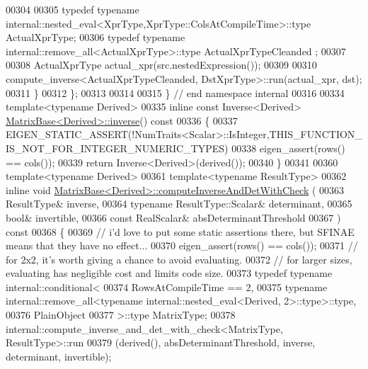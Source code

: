 \begin{DoxyCode}
00304 
00305     \textcolor{keyword}{typedef} \textcolor{keyword}{typename} internal::nested\_eval<XprType,XprType::ColsAtCompileTime>::type  ActualXprType;
00306     \textcolor{keyword}{typedef} \textcolor{keyword}{typename} internal::remove\_all<ActualXprType>::type                        ActualXprTypeCleanded
      ;
00307     
00308     ActualXprType actual\_xpr(src.nestedExpression());
00309     
00310     compute\_inverse<ActualXprTypeCleanded, DstXprType>::run(actual\_xpr, dst);
00311   \}
00312 \};
00313 
00314   
00315 \} \textcolor{comment}{// end namespace internal}
00316 
00334 \textcolor{keyword}{template}<\textcolor{keyword}{typename} Derived>
00335 \textcolor{keyword}{inline} \textcolor{keyword}{const} Inverse<Derived> \hyperlink{group___core___module_a7712eb69e8ea3c8f7b8da1c44dbdeebf}{MatrixBase<Derived>::inverse}()\textcolor{keyword}{ const}
00336 \textcolor{keyword}{}\{
00337   EIGEN\_STATIC\_ASSERT(!NumTraits<Scalar>::IsInteger,THIS\_FUNCTION\_IS\_NOT\_FOR\_INTEGER\_NUMERIC\_TYPES)
00338   eigen\_assert(rows() == cols());
00339   \textcolor{keywordflow}{return} Inverse<Derived>(derived());
00340 \}
00341 
00360 \textcolor{keyword}{template}<\textcolor{keyword}{typename} Derived>
00361 \textcolor{keyword}{template}<\textcolor{keyword}{typename} ResultType>
00362 \textcolor{keyword}{inline} \textcolor{keywordtype}{void} \hyperlink{group___core___module_a7baaf2fdec0191a2166cf9fd84a2dcb2}{MatrixBase<Derived>::computeInverseAndDetWithCheck}
      (
00363     ResultType& inverse,
00364     \textcolor{keyword}{typename} ResultType::Scalar& determinant,
00365     \textcolor{keywordtype}{bool}& invertible,
00366     \textcolor{keyword}{const} RealScalar& absDeterminantThreshold
00367   )\textcolor{keyword}{ const}
00368 \textcolor{keyword}{}\{
00369   \textcolor{comment}{// i'd love to put some static assertions there, but SFINAE means that they have no effect...}
00370   eigen\_assert(rows() == cols());
00371   \textcolor{comment}{// for 2x2, it's worth giving a chance to avoid evaluating.}
00372   \textcolor{comment}{// for larger sizes, evaluating has negligible cost and limits code size.}
00373   \textcolor{keyword}{typedef} \textcolor{keyword}{typename} internal::conditional<
00374     RowsAtCompileTime == 2,
00375     \textcolor{keyword}{typename} internal::remove\_all<typename internal::nested\_eval<Derived, 2>::type>::type,
00376     PlainObject
00377   >::type MatrixType;
00378   internal::compute\_inverse\_and\_det\_with\_check<MatrixType, ResultType>::run
00379     (derived(), absDeterminantThreshold, inverse, determinant, invertible);

\end{DoxyCode}
